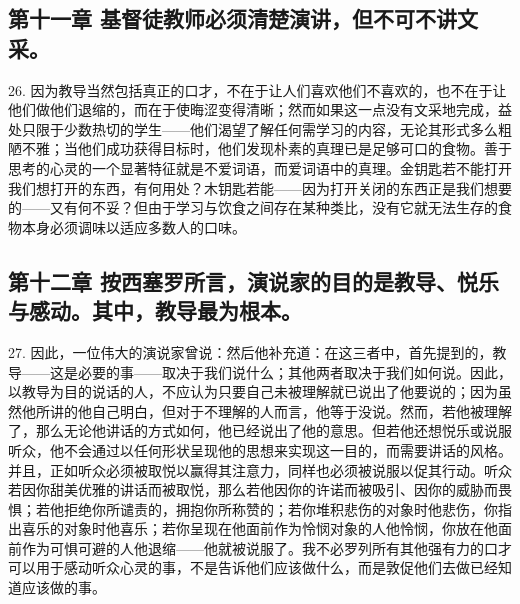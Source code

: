
\subsection{第十一章 基督徒教师必须清楚演讲，但不可不讲文采。}

26. 因为教导当然包括真正的口才，不在于让人们喜欢他们不喜欢的，也不在于让他们做他们退缩的，而在于使晦涩变得清晰；然而如果这一点没有文采地完成，益处只限于少数热切的学生——他们渴望了解任何需学习的内容，无论其形式多么粗陋不雅；当他们成功获得目标时，他们发现朴素的真理已是足够可口的食物。善于思考的心灵的一个显著特征就是不爱词语，而爱词语中的真理。金钥匙若不能打开我们想打开的东西，有何用处？木钥匙若能——因为打开关闭的东西正是我们想要的——又有何不妥？但由于学习与饮食之间存在某种类比，没有它就无法生存的食物本身必须调味以适应多数人的口味。\par


\subsection{第十二章 按西塞罗所言，演说家的目的是教导、悦乐与感动。其中，教导最为根本。}

27. 因此，一位伟大的演说家曾说：然后他补充道：在这三者中，首先提到的，教导——这是必要的事——取决于我们说什么；其他两者取决于我们如何说。因此，以教导为目的说话的人，不应认为只要自己未被理解就已说出了他要说的；因为虽然他所讲的他自己明白，但对于不理解的人而言，他等于没说。然而，若他被理解了，那么无论他讲话的方式如何，他已经说出了他的意思。但若他还想悦乐或说服听众，他不会通过以任何形状呈现他的思想来实现这一目的，而需要讲话的风格。并且，正如听众必须被取悦以赢得其注意力，同样也必须被说服以促其行动。听众若因你甜美优雅的讲话而被取悦，那么若他因你的许诺而被吸引、因你的威胁而畏惧；若他拒绝你所谴责的，拥抱你所称赞的；若你堆积悲伤的对象时他悲伤，你指出喜乐的对象时他喜乐；若你呈现在他面前作为怜悯对象的人他怜悯，你放在他面前作为可惧可避的人他退缩——他就被说服了。我不必罗列所有其他强有力的口才可以用于感动听众心灵的事，不是告诉他们应该做什么，而是敦促他们去做已经知道应该做的事。\par

